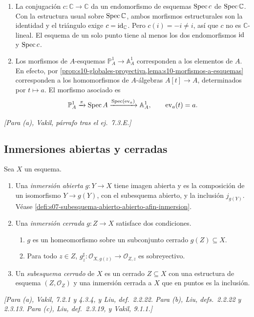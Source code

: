 \begin{ejem}
\label{ejem:s10-dos-lecturas}
\begin{enumerate}[label=(\alph*)]
\item La conjugación \(c\colon\mathbb C\to\mathbb C\) da un endomorfismo de esquemas \(\operatorname{Spec} c\) de \(\operatorname{Spec}\mathbb C\). Con la estructura usual sobre \(\operatorname{Spec}\mathbb C\), ambos morfismos estructurales son la identidad y el triángulo exige \(c=\operatorname{id}_{\mathbb C}\). Pero \(c(i)=-i\ne i\), así que \(c\) no es \(\mathbb C\)-lineal. El esquema de un solo punto tiene al menos los dos endomorfismos \(\operatorname{id}\) y \(\operatorname{Spec} c\).
\item Los morfismos de \(A\)-esquemas \(\mathbb P^1_A\to\mathbb A^1_A\) corresponden a los elementos de \(A\). En efecto, por \cref{prop:s10-globales-proyectiva,lema:s10-morfismos-a-esquemas} corresponden a los homomorfismos de \(A\)-álgebras \(A[t]\to A\), determinados por \(t\mapsto a\). El morfismo asociado es
\[
 \mathbb P^1_A\xrightarrow{\pi}\operatorname{Spec} A\xrightarrow{\operatorname{Spec}(\operatorname{ev}_a)}\mathbb A^1_A,
 \qquad \operatorname{ev}_a(t)=a.
\]
\end{enumerate}
\emph{[Para (a), Vakil, párrafo tras el ej.~7.3.E.]}
\end{ejem}

\subsection{Inmersiones abiertas y cerradas}

\begin{defi}
\label{defi:s10-inmersiones}
Sea \(X\) un esquema.
\begin{enumerate}[label=(\alph*)]
\item Una \emph{inmersión abierta} \(g\colon Y\to X\) tiene imagen abierta y es la composición de un isomorfismo \(Y\to g(Y)\), con el subesquema abierto, y la inclusión \(j_{g(Y)}\). Véase \cref{defi:s07-subesquema-abierto-abierto-afin-inmersion}.
\item Una \emph{inmersión cerrada} \(g\colon Z\to X\) satisface dos condiciones.
\begin{enumerate}[label=(\roman*)]
\item \(g\) es un homeomorfismo sobre un subconjunto cerrado \(g(Z)\subseteq X\).
\item Para todo \(z\in Z\), \(g_z^\sharp\colon\mathcal O_{X,g(z)}\to\mathcal O_{Z,z}\) es sobreyectivo.
\end{enumerate}
\item Un \emph{subesquema cerrado} de \(X\) es un cerrado \(Z\subseteq X\) con una estructura de esquema \((Z,\mathcal O_Z)\) y una inmersión cerrada a \(X\) que en puntos es la inclusión.
\end{enumerate}
\emph{[Para (a), Vakil, 7.2.1 y 4.3.4, y Liu, def.~2.2.22. Para (b), Liu, defs.~2.2.22 y 2.3.13. Para (c), Liu, def.~2.3.19, y Vakil, 9.1.1.]}
\end{defi}

